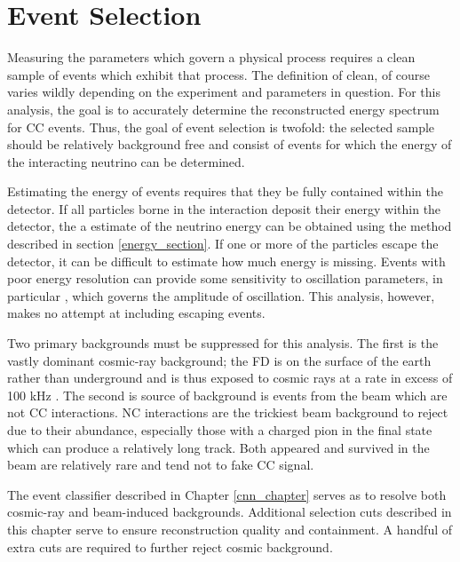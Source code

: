 \chapter{Event Selection}
\label{event_selection_chapter}

Measuring the parameters which govern a physical process requires
a clean sample of events which exhibit that process.
The definition of clean, of course varies wildly depending on the
experiment and parameters in question.
For this analysis, the goal is to accurately determine the reconstructed energy
spectrum for \numu CC events.
Thus, the goal of event selection is twofold: the selected sample should be
relatively background free and consist of events for which the energy of the
interacting neutrino can be determined.

Estimating the energy of events requires that they be fully contained
within the detector.
If all particles borne in the interaction deposit their energy within
the detector, the a estimate of the neutrino energy can be obtained using
the method described in section \ref{energy_section}.
If one or more of the particles escape the detector, it can be difficult
to estimate how much energy is missing.
Events with poor energy resolution can provide some sensitivity to oscillation
parameters, in particular \thetatth, which governs the amplitude of oscillation.
This analysis, however, makes no attempt at including escaping events.

Two primary backgrounds must be suppressed for this analysis.
The first is the vastly dominant cosmic-ray background; the FD is
on the surface of the earth rather than underground
and is thus exposed to cosmic rays at a rate in excess of 100 kHz \cite{tdr}.
The second is source of background is events from the \numi beam which are
not \numu CC interactions.
NC interactions are the trickiest beam background to reject due to their
abundance, especially those with a charged pion in the final state which
can produce a relatively long track.
Both appeared and survived \nue in the beam are relatively rare and tend
not to fake \numu CC signal.

The event classifier described in Chapter \ref{cnn_chapter} serves as to resolve
both cosmic-ray and beam-induced backgrounds.
Additional selection cuts described in this chapter serve to ensure
reconstruction quality and containment.
A handful of extra cuts are required to further reject cosmic background.


